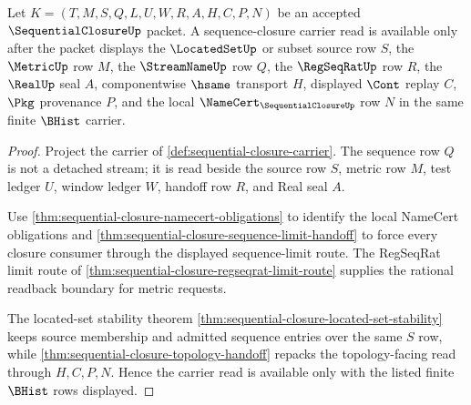 \begin{theorem}
\label{thm:sequential-closure-root-sequence-carrier}
Let $K=(T,M,S,Q,L,U,W,R,A,H,C,P,N)$ be an accepted $\SequentialClosureUp$ packet. A sequence-closure carrier read is available only after the packet displays the $\LocatedSetUp$ or subset source row $S$, the $\MetricUp$ row $M$, the $\StreamNameUp$ row $Q$, the $\RegSeqRatUp$ row $R$, the $\RealUp$ seal $A$, componentwise $\hsame$ transport $H$, displayed $\Cont$ replay $C$, $\Pkg$ provenance $P$, and the local $\NameCert_{\SequentialClosureUp}$ row $N$ in the same finite $\BHist$ carrier.
\end{theorem}
\begin{proof}
Project the carrier of \autoref{def:sequential-closure-carrier}. The sequence row $Q$ is not a detached stream; it is read beside the source row $S$, metric row $M$, test ledger $U$, window ledger $W$, handoff row $R$, and Real seal $A$.

Use \autoref{thm:sequential-closure-namecert-obligations} to identify the local NameCert obligations and \autoref{thm:sequential-closure-sequence-limit-handoff} to force every closure consumer through the displayed sequence-limit route. The RegSeqRat limit route of \autoref{thm:sequential-closure-regseqrat-limit-route} supplies the rational readback boundary for metric requests.

The located-set stability theorem \autoref{thm:sequential-closure-located-set-stability} keeps source membership and admitted sequence entries over the same $S$ row, while \autoref{thm:sequential-closure-topology-handoff} repacks the topology-facing read through $H,C,P,N$. Hence the carrier read is available only with the listed finite $\BHist$ rows displayed.
\end{proof}


